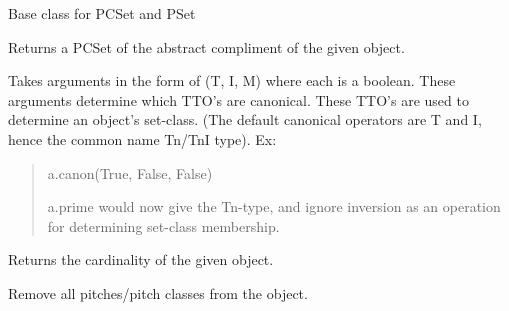 \documentclass[letterpaper,10pt,english]{sphinxmanual}
\begin{document}

\begin{fulllineitems}
\label{_templates/core:core.PPCSetBase}
Base class for PCSet and PSet

\begin{fulllineitems}
\label{_templates/core:core.PPCSetBase.abstract_compliment}
Returns a PCSet of the abstract compliment of the given object.

\end{fulllineitems}


\begin{fulllineitems}
\label{_templates/core:core.PPCSetBase.canon}
Takes arguments in the form of (T, I, M) where each is a boolean.
These arguments determine which TTO's are canonical. These TTO's are
used to determine an object's set-class.
(The default canonical operators are T and I, hence the common name
Tn/TnI type).
Ex:
\begin{quote}

a.canon(True, False, False)

a.prime would now give the Tn-type, and ignore inversion as an
operation for determining set-class membership.
\end{quote}

\end{fulllineitems}


\begin{fulllineitems}
\label{_templates/core:core.PPCSetBase.cardinality}
Returns the cardinality of the given object.

\end{fulllineitems}


\begin{fulllineitems}
\label{_templates/core:core.PPCSetBase.clear}
Remove all pitches/pitch classes from the object.

\end{fulllineitems}


\end{fulllineitems}
\end{document}
